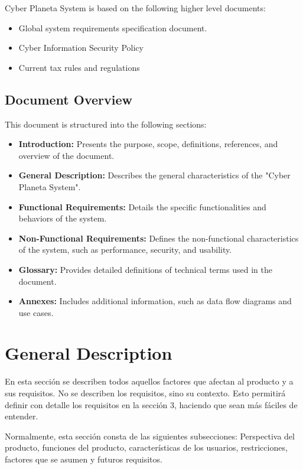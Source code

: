 \documentclass[12pt,a4paper, twosite]{article}
\begin{document}
Cyber Planeta System is based on the following higher level documents:
\begin{itemize}
    \item Global system requirements specification document.
    \item Cyber Information Security Policy
    \item Current tax rules and regulations
\end{itemize}


\subsection{Document Overview}
\label{sec:orgdaca22c}
This document is structured into the following sections:

\begin{itemize}
  \item \textbf{Introduction:} Presents the purpose, scope, definitions, references, and overview of the document.
  \item \textbf{General Description:} Describes the general characteristics of the "Cyber Planeta System".
  \item \textbf{Functional Requirements:} Details the specific functionalities and behaviors of the system.
  \item \textbf{Non-Functional Requirements:} Defines the non-functional characteristics of the system, such as performance, security, and usability.
  \item \textbf{Glossary:} Provides detailed definitions of technical terms used in the document.
  \item \textbf{Annexes:} Includes additional information, such as data flow diagrams and use cases.
\end{itemize}


\section{General Description}
\label{sec:orgc1c4017}

En esta sección se describen todos aquellos factores que afectan al
producto y a sus requisitos. No se describen los requisitos, sino su
contexto. Esto permitirá definir con detalle los requisitos en la
sección 3, haciendo que sean más fáciles de entender.

Normalmente, esta sección consta de las siguientes subsecciones:
Perspectiva del producto, funciones del producto, características de
los usuarios, restricciones, factores que se asumen y futuros
requisitos.
\end{document}
